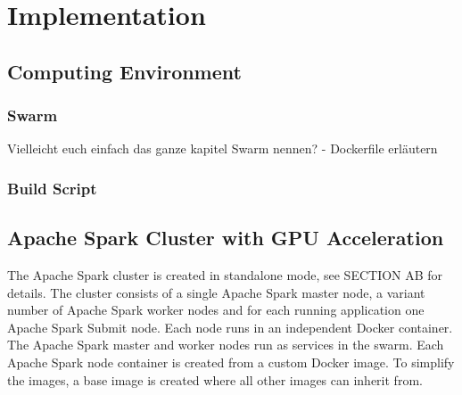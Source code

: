\chapter{Implementation}
\label{sec:06_implementation}


\section{Computing Environment}


\subsection{Swarm}
Vielleicht euch einfach das ganze kapitel Swarm nennen?
- Dockerfile erläutern


\subsection{Build Script}


\section{Apache Spark Cluster with GPU Acceleration}
The Apache Spark cluster is created in standalone mode, see SECTION AB for details. The cluster consists of a single Apache Spark master node, a variant number of Apache Spark worker nodes and for each running application one Apache Spark Submit node. Each node runs in an independent Docker container. The Apache Spark master and worker nodes run as services in the swarm. Each Apache Spark node container is created from a custom Docker image. To simplify the images, a base image is created where all other images can inherit from.

